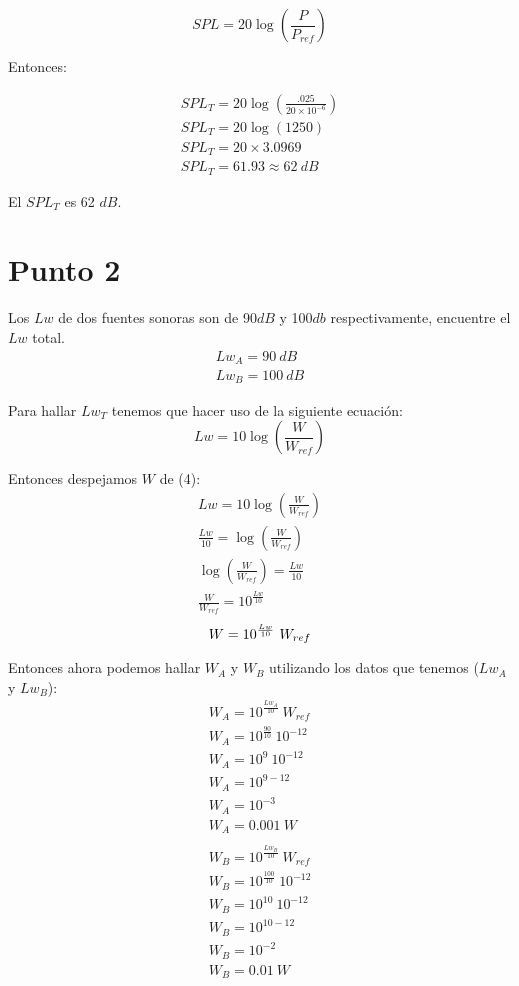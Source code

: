 \documentclass{article}
\begin{document}
\begin{equation}
    SPL = 20 \log(\frac{P}{P_{ref}})
\end{equation}

Entonces:

\begin{gather*}
    SPL_T = 20 \log(\frac{.025}{20 \times 10^{-6}})\\
    SPL_T = 20 \log(1250)\\
    SPL_T = 20 \times 3.0969\\
    SPL_T = 61.93 \approx 62\ dB
\end{gather*}

El $SPL_T$ es 62 $dB$.

\section{Punto 2}

Los $Lw$ de dos fuentes sonoras son de 90$dB$ y 100$db$ respectivamente, encuentre el $Lw$ total.
\begin{gather*}
    Lw_A = 90\ dB\\
    Lw_B = 100\ dB
\end{gather*}

Para hallar $Lw_T$ tenemos que hacer uso de la siguiente ecuación:
\begin{equation}
    Lw = 10 \log(\frac{W}{W_{ref}})
\end{equation}

Entonces despejamos $W$ de (4):
\begin{gather*}
    Lw = 10 \log(\frac{W}{W_{ref}})\\
    \frac{Lw}{10} = \log(\frac{W}{W_{ref}})\\
    \log(\frac{W}{W_{ref}}) = \frac{Lw}{10}\\
    \frac{W}{W_{ref}} = 10^{\frac{Lw}{10}}
\end{gather*}
\begin{equation}
    W = 10^{\frac{Lw}{10}}\ W_{ref}\\
\end{equation}

Entonces ahora podemos hallar $W_A$ y $W_B$ utilizando los datos que tenemos ($Lw_A$ y $Lw_B$):
\begin{gather*}
    W_A = 10^{\frac{Lw_A}{10}}\ W_{ref}\\
    W_A = 10^{\frac{90}{10}}\ 10^{-12}\\
    W_A = 10^{9}\ 10^{-12}\\
    W_A = 10^{9-12}\\
    W_A = 10^{-3}\\
    W_A = 0.001\ W\\\\
    W_B = 10^{\frac{Lw_B}{10}}\ W_{ref}\\
    W_B = 10^{\frac{100}{10}}\ 10^{-12}\\
    W_B = 10^{10}\ 10^{-12}\\
    W_B = 10^{10-12}\\
    W_B = 10^{-2}\\
    W_B = 0.01\ W
\end{gather*}
\end{document}
